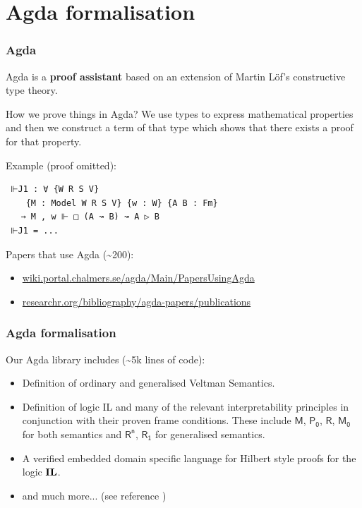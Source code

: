 \documentclass[xcolor={x11names}]{beamer}
\newcommand{\prin}[1]{\ensuremath{\textbf{\textup{#1}}}\xspace}
\newcommand{\il}{\prin{IL}}
\newcommand{\principle}[1]{\text{$\mathsf{#1}$}}
\begin{document}
\section{Agda formalisation}
\begin{frame}[fragile]
  \frametitle{Agda}
  Agda is a \textbf{proof assistant} based on an extension of Martin Löf's constructive
  type theory.

  \pause
  How we prove things in Agda? We use types to express mathematical properties
  and then we construct a term of that type which shows that there exists a proof
  for that property.

  \pause
  Example (proof omitted):
\begin{verbatim}
 ⊩J1 : ∀ {W R S V}
    {M : Model W R S V} {w : W} {A B : Fm}
   → M , w ⊩ □ (A ↝ B) ↝ A ▷ B
 ⊩J1 = ...
\end{verbatim}

  \vspace{0.1cm}
  \pause
  Papers that use Agda (\textasciitilde 200):

  \begin{itemize}
  \item \href{https://wiki.portal.chalmers.se/agda/Main/PapersUsingAgda}{wiki.portal.chalmers.se/agda/Main/PapersUsingAgda}

  \item \href{https://researchr.org/bibliography/agda-papers/publications}{researchr.org/bibliography/agda-papers/publications}
  \end{itemize}
\end{frame}


\begin{frame}
  \frametitle{Agda formalisation}
  Our Agda library includes (\textasciitilde 5k lines of code):
  \begin{itemize}
  \item Definition of ordinary and generalised Veltman Semantics.
  \item Definition of logic IL and many of the relevant interpretability
    principles in conjunction with their proven frame conditions. These include
    $\principle{M}$, $\principle{P_0}$, $\principle{R}$, $\principle{M_0}$ for
    both semantics and $\principle{R^n}$, $\principle{R_1}$ for generalised
    semantics.
  \item A verified embedded domain specific language for Hilbert style proofs
    for the logic \il.
  \item and much more... (see reference \cite{MasRovira:2020:MastersThesis})
  \end{itemize}
\end{frame}
\end{document}
